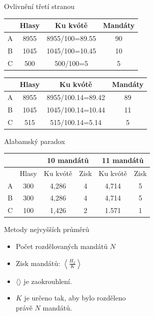 \documentclass[17pt]{beamer}
\begin{document}
\begin{frame}{Ovlivnění třetí stranou}
\begin{center}
\begin{tabular}{|c|c|c|c|}
\hline 
 & Hlasy & Ku kvótě & Mandáty \\ 
\hline 
A & 8955 & 8955/100=89.55 & 90 \\ 
\hline 
B & 1045 & 1045/100=10.45 & 10 \\ 
\hline 
C & 500 & 500/100=5 & 5 \\ 
\hline 
\end{tabular} 
\end{center} 
\begin{center}
\begin{tabular}{|c|c|c|c|}
\hline 
 & Hlasy & Ku kvótě & Mandáty \\ 
\hline 
A & 8955 & 8955/100.14=89.42 & 89 \\ 
\hline 
B & 1045 & 1045/100.14=10.44 & 11 \\ 
\hline 
C & 515 & 515/100.14=5.14 & 5 \\ 
\hline 
\end{tabular} 
\end{center}
\end{frame}

\begin{frame}{Alabamský paradox}
\begin{center}
\begin{tabular}{|c|c|c|c|c|c|}
\hline 
 &  & \multicolumn{2}{c|}{10 mandátů} & \multicolumn{2}{c|}{11 mandátů} \\ 
\hline 
 & Hlasy & Ku kvótě & Zisk & Ku kvótě & Zisk \\ 
\hline 
A & 300 & 4,286 & 4 & 4,714 & 5 \\ 
\hline 
B & 300 & 4,286 & 4 & 4,714 & 5 \\ 
\hline 
C & 100 & 1,426 & 2 & 1.571 & 1 \\ 
\hline
\end{tabular} 
\end{center}
\end{frame}

\begin{frame}{Metody nejvyšších průměrů}
\begin{itemize}
\item Počet rozdělovaných mandátů $N$
\item Zisk mandátů: $\left\langle\frac{H_{x}}{K}\right\rangle$
\item $\langle$\hspace{0.15cm}$\rangle$ je zaokrouhlení.
\item $K$ je určeno tak, aby bylo rozděleno \\ právě $N$ mandátů.
\end{itemize}
\end{frame}
\end{document}

